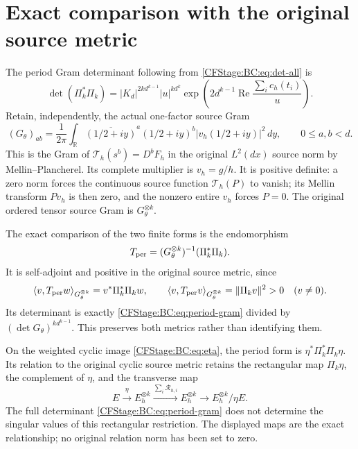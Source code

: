 \section{Exact comparison with the original source metric}

The period Gram determinant following from \eqref{CFStage:BC:eq:det-all} is
\begin{equation}
 \det(\Pi_k^*\Pi_k)=|K_d|^{2k d^{k-1}}|u|^{k d^k}
    \exp\!\left(2d^{k-1}\operatorname{Re}
                    \frac{\sum_i c_h(t_i)}u\right).
 \label{CFStage:BC:eq:period-gram}
\end{equation}
Retain, independently, the actual one-factor source Gram
\begin{equation}
 (G_\theta)_{ab}=\frac1{2\pi}\int_{\mathbb R}
     \overline{(1/2+iy)}^{a}(1/2+iy)^b
       |v_h(1/2+iy)|^2\,dy,\qquad 0\le a,b<d.
 \label{CFStage:BC:eq:theta-gram}
\end{equation}
This is the Gram of $\mathcal T_h(s^b)=D^bF_h$ in the original
$L^2(dx)$ source norm by Mellin--Plancherel.  Its complete multiplier is
$v_h=g/h$.  It is positive definite: a zero norm forces the continuous
source function $\mathcal T_h(P)$ to vanish; its Mellin transform
$Pv_h$ is then zero, and the nonzero entire $v_h$ forces $P=0$.
The original ordered tensor source Gram is $G_\theta^{\otimes k}$.

The exact comparison of the two finite forms is the endomorphism
\begin{equation}
 T_{\rm per}=(G_\theta^{\otimes k})^{-1}(\Pi_k^*\Pi_k).
 \label{CFStage:BC:eq:metric-map}
\end{equation}
It is self-adjoint and positive in the original source metric, since
\[
 \langle v,T_{\rm per}w\rangle_{G_\theta^{\otimes k}}
     =v^*\Pi_k^*\Pi_k w,
 \qquad
 \langle v,T_{\rm per}v\rangle_{G_\theta^{\otimes k}}
     =\|\Pi_kv\|^2>0\quad(v\ne0).
\]
Its determinant is exactly \eqref{CFStage:BC:eq:period-gram} divided by
$(\det G_\theta)^{k d^{k-1}}$.  This preserves both metrics rather
than identifying them.

On the weighted cyclic image \eqref{CFStage:BC:eq:eta}, the period form is
$\eta^*\Pi_k^*\Pi_k\eta$.  Its relation to the original cyclic
source metric retains the rectangular map $\Pi_k\eta$, the complement
of $\eta$, and the transverse map
\[
 E\xrightarrow{\eta}E_h^{\otimes k}
 \xrightarrow{\sum_i\mathcal R_{h,i}}E_h^{\otimes k}
 \longrightarrow E_h^{\otimes k}/\eta E.
\]
The full determinant \eqref{CFStage:BC:eq:period-gram} does not determine the
singular values of this rectangular restriction.  The displayed maps
are the exact relationship; no original relation norm has been set to
zero.

